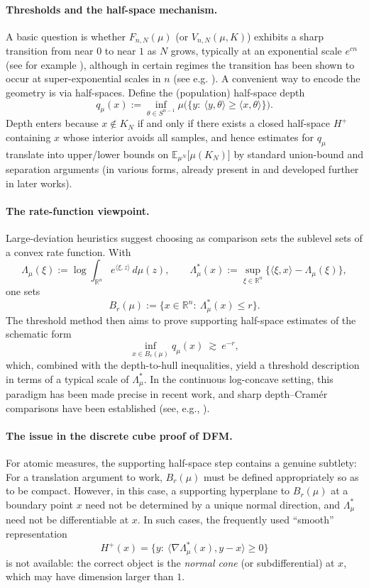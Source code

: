 \documentclass[11pt,a4paper]{article} %
\theoremstyle{definition}
\theoremstyle{remark}
\newcommand{\R}{\mathbb{R}}
\newcommand{\E}{\mathbb{E}}
\newcommand{\1}{\mathds{1}}
\begin{document}
\paragraph{Thresholds and the half-space mechanism.}
A basic question is whether $F_{n,N}(\mu)$ (or $V_{n,N}(\mu,K)$) exhibits a sharp transition
from near $0$ to near $1$ as $N$ grows, typically at an exponential scale $e^{cn}$ (see for example \cite{BC,FPT,GaGia,Paf}),
although in certain regimes the transition has been shown to occur at
super-exponential scales in $n$ (see e.g.  \cite{BCGTT,BC}). A convenient way to encode the geometry is via half-spaces. Define the (population) half-space depth
\[
q_\mu(x):=\inf_{\theta\in S^{n-1}} \mu\big(\{y:\ \langle y,\theta\rangle\ge \langle x,\theta\rangle\}\big).
\]
Depth enters because $x\notin K_N$ if and only if there exists a closed half-space $H^+$ containing $x$ whose interior avoids all samples, and hence
estimates for $q_\mu$ translate into upper/lower bounds on $\E_{\mu^N} \big[\mu(K_N)\big]$ by standard union-bound and separation arguments (in various forms,
already present in \cite{DFM} and developed further in later works).

\paragraph{The rate-function viewpoint.}
Large-deviation heuristics suggest choosing as comparison sets the sublevel sets of a convex rate function. With
\[
\Lambda_\mu(\xi):=\log\int_{\R^n} e^{\langle \xi,z\rangle}\,d\mu(z),
\qquad
\Lambda_\mu^\ast(x):=\sup_{\xi\in\R^n}\{\langle \xi,x\rangle-\Lambda_\mu(\xi)\},
\]
one sets
\[
B_r(\mu):=\{x\in\R^n:\ \Lambda_\mu^\ast(x)\le r\}.
\]
The threshold method then aims to prove supporting half-space estimates of the schematic form
\[
\inf_{x\in B_r(\mu)} q_\mu(x)\ \gtrsim\ e^{-r},
\]
which, combined with the depth-to-hull inequalities, yield a threshold description in terms of a typical scale of $\Lambda_\mu^\ast$.
In the continuous log-concave setting, this paradigm has been made precise in recent work, and sharp depth--Cram\'er comparisons
have been established (see, e.g., \cite{BC, BGP}).

\paragraph{The issue in the discrete cube proof of DFM.}
For atomic measures, the supporting half-space step contains a genuine subtlety: For a translation argument to work, $B_{r}(\mu)$ must be defined appropriately so as to be compact. However, in this case, a supporting
hyperplane to $B_r(\mu)$ at a boundary point $x$ need not be determined by a unique normal direction, and $\Lambda_\mu^\ast$ need not be
differentiable at $x$. In such cases, the frequently used ``smooth'' representation
\[
H^+(x)=\{y:\ \langle \nabla \Lambda_\mu^\ast(x),y-x\rangle\ge 0\}
\]
is not available: the correct object is the \emph{normal cone} (or subdifferential) at $x$, which may have dimension larger than $1$.
\end{document}
